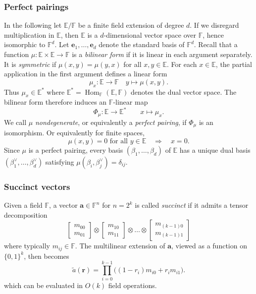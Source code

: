 \documentclass[11pt,letterpaper,usenames,dvipsnames]{article}
\begin{document}
\subsubsection{Perfect pairings}
In the following let $\mathbb{E}/\mathbb{F}$ be a finite field extension of degree $d$. If we disregard multiplication in $\mathbb{E}$, then $\mathbb{E}$ is a $d$-dimensional vector space over $\mathbb{F}$, hence isomorphic to $\mathbb{F}^d$. Let $\mathbf{e}_1,\ldots,\mathbf{e}_d$ denote the standard basis of $\mathbb{F}^d$.
Recall that a function $\mu:\mathbb{E}\times \mathbb{E} \rightarrow \mathbb{F}$ is a \emph{bilinear form}  if it is linear in each argument separately. It is \emph{symmetric} if $\mu(x, y) = \mu(y, x)$ for all $x,y \in \mathbb{E}$.
For each $x \in \mathbb{E}$, the partial application in the first argument defines a linear form
\[
\mu_{x} : \mathbb{E} \rightarrow \mathbb{F} \quad y \mapsto \mu(x, y).
\]
Thus $\mu_{x} \in \mathbb{E}^*$ where $\mathbb{E}^* = \operatorname{Hom}_\mathbb{F}(\mathbb{E}, \mathbb{F})$ denotes the dual vector space. The bilinear form therefore induces an $\mathbb{F}$-linear map
\[
\Phi_\mu:\mathbb{E}\to\mathbb{E}^* \qquad x\mapsto\mu_x.
\]
We call $\mu$ \emph{nondegenerate}, or equivalently a \emph{perfect pairing}, if $\Phi_\mu$ is an isomorphism. Or equivalently for finite spaces,  %
\[
\mu(x,y)=0\text{ for all }y\in\mathbb E \quad\Longrightarrow\quad x=0.
\]
Since $\mu$ is a perfect pairing, every basis $(\beta_1,\ldots,\beta_d)$ of $\mathbb{E}$ has a unique dual basis $(\beta_1^\vee,\ldots,\beta_d^\vee)$ satisfying $\mu(\beta_i, \beta_j^\vee) = \delta_{ij}$.


\subsubsection{Succinct vectors}

Given a field $\mathbb{F}$, a vector $\mathbf{a} \in \mathbb{F}^n$ for $n = 2^k$ is called \emph{succinct} if it admits a tensor decomposition
\begin{equation}
\begin{bmatrix}
m_{00} \\ m_{01}
\end{bmatrix}
\otimes
\begin{bmatrix}
m_{10} \\ m_{11}
\end{bmatrix}
\otimes \dots \otimes
\begin{bmatrix}
m_{(k-1)0} \\ m_{(k-1)1}
\end{bmatrix}
\end{equation}
where typically $m_{ij} \in \mathbb{F}$. The multilinear extension of $\mathbf{a}$, viewed as a function on $\{0,1\}^k$, then becomes
\begin{equation}
\widetilde{a}(\mathbf{r}) = \prod_{i=0}^{k-1} \bigl( (1 - r_i) m_{i0} + r_i m_{i1} \bigr) \text{.}
\end{equation}
which can be evaluated in $O(k)$ field operations.
\end{document}
